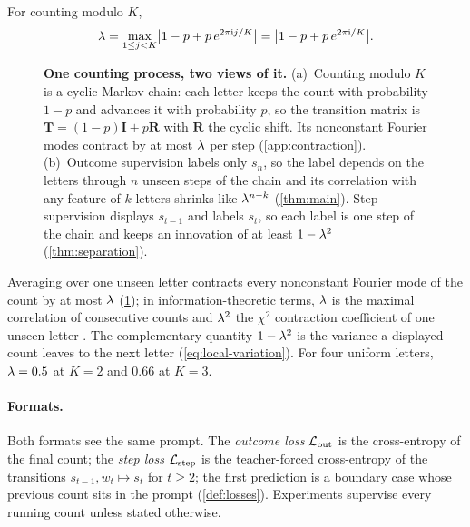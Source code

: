 \begin{definition}
\label{def:lambda}
For counting modulo $K$,
\begin{equation}
 \lambda=\max_{1\le j<K}\bigl|1-p+p\,e^{2\pi\mathrm ij/K}\bigr|=\bigl|1-p+p\,e^{2\pi\mathrm i/K}\bigr|.
 \label{eq:lambda}
\end{equation}
\end{definition}

\begin{figure}[t]
\centering
\resizebox{\linewidth}{!}{}
\caption{\textbf{One counting process, two views of it.}
(a)~Counting modulo $K$ is a cyclic Markov chain: each letter keeps the count with probability $1-p$ and advances it with probability
$p$, so the transition matrix is $\mathbf T=(1-p)\mathbf I+p\mathbf R$ with $\mathbf R$ the cyclic shift. Its nonconstant Fourier modes
contract by at most $\lambda$ per step (\cref{app:contraction}).
(b)~Outcome supervision labels only $s_n$, so the label depends on the letters through $n$ unseen steps of the chain and its
correlation with any feature of $k$ letters shrinks like $\lambda^{n-k}$ (\cref{thm:main}). Step supervision displays $s_{t-1}$ and labels $s_t$, so each label is one
step of the chain and keeps an innovation of at least $1-\lambda^2$ (\cref{thm:separation}).}
\label{fig:chain}
\end{figure}

Averaging over one unseen letter contracts every nonconstant Fourier mode of the count by at most $\lambda$ (\cref{fig:chain}); in information-theoretic terms,
$\lambda$ is the maximal correlation of consecutive counts and $\lambda^2$ the $\chi^2$ contraction coefficient of one
unseen letter \citep{witsenhausen1975sequences,raginsky2016strong}. The complementary quantity $1-\lambda^2$ is the
variance a displayed count leaves to the next letter (\cref{eq:local-variation}). For four uniform letters,
$\lambda=0.5$ at $K=2$ and $0.66$ at $K=3$.

\paragraph{Formats.} Both formats see the same prompt. The \emph{outcome loss} $\mathcal L_{\mathrm{out}}$ is the cross-entropy of the final
count; the \emph{step loss} $\mathcal L_{\mathrm{step}}$ is the teacher-forced cross-entropy of the transitions $s_{t-1},w_t\mapsto s_t$ for
$t\ge2$; the first prediction is a boundary case whose previous count sits in the prompt (\cref{def:losses}). Experiments
supervise every running count unless stated otherwise.

